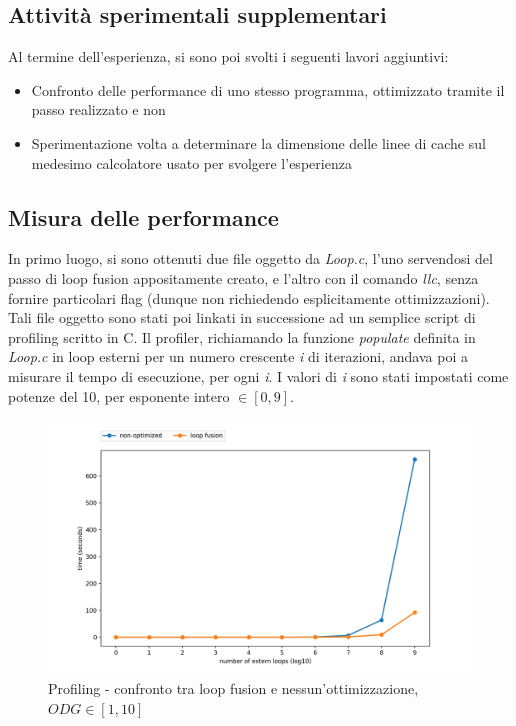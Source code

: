 \documentclass[letterpaper, 11pt]{article}
\begin{document}
\begin{multicols}{2}

  \section{Attività sperimentali supplementari}

  Al termine dell'esperienza, si sono poi svolti i seguenti lavori aggiuntivi:

  \begin{itemize}
    \item Confronto delle performance di uno stesso programma, ottimizzato tramite il passo realizzato e non
    \item Sperimentazione volta a determinare la dimensione delle linee di cache sul medesimo calcolatore usato per svolgere l'esperienza
  \end{itemize}

  \subsection{Misura delle performance}
  In primo luogo, si sono ottenuti due file oggetto da \textit{Loop.c}, l'uno servendosi del passo di loop fusion appositamente creato, e l'altro con il comando \textit{llc}, senza fornire particolari flag (dunque non richiedendo esplicitamente ottimizzazioni).\\
  Tali file oggetto sono stati poi linkati in successione ad un semplice script di profiling scritto in C. Il profiler, richiamando la funzione \textit{populate} definita in \textit{Loop.c} in loop esterni per un numero crescente \textit{i} di iterazioni, andava poi a misurare il tempo di esecuzione, per ogni \textit{i}. I valori di \textit{i} sono stati impostati come potenze del 10, per esponente intero $\in [0,9]$.\\

  \begin{figure}[H]
    \centering
    \includegraphics[width = 1.1 \linewidth]{../LocalOpts/graph_1-10.png}
    \caption{Profiling - confronto tra loop fusion e nessun'ottimizzazione, $ODG \in [1,10]$}
  \end{figure}


\end{multicols}
\end{document}
